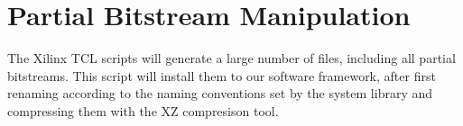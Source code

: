 

\section{Partial Bitstream Manipulation}
The Xilinx TCL scripts will generate a large number of files, 
including all partial bitstreams. This script will install them to our software framework,
after first renaming according to the naming conventions set by the system library
and compressing them with the XZ compresison tool.



